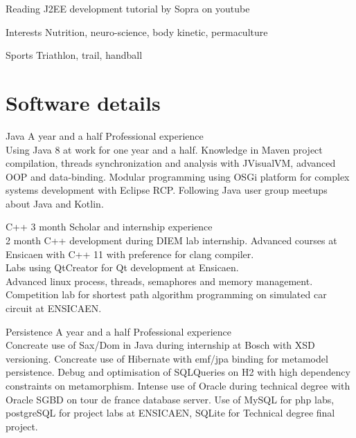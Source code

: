 \documentclass{tccv-master/tccv}
\begin{document}
\begin{factlist}

\item{Reading}
	{J2EE development tutorial by Sopra on youtube}
\item{Interests}
	{Nutrition, neuro-science, body kinetic, permaculture}
\item{Sports}
	{Triathlon, trail, handball}
\end{factlist}
\newpage




\section{Software details}

\begin{eventlist}

\item
{Java}
{A year and a half}
{Professional experience}\\
Using Java 8 at work for one year and a half.
Knowledge in Maven project compilation, threads synchronization and analysis with JVisualVM, advanced OOP and data-binding.
Modular programming using OSGi platform for complex systems development with Eclipse RCP.
Following Java user group meetups about Java and Kotlin.

\item
{C++}
{3 month}
{Scholar and internship experience}\\
2 month C++ development during DIEM lab internship.
Advanced courses at Ensicaen with C++ 11 with preference for clang compiler.\\
Labs using QtCreator for Qt development at Ensicaen.\\
Advanced linux process, threads, semaphores and memory management.
Competition lab for shortest path algorithm programming on simulated car circuit at ENSICAEN.


\item
{Persistence}
{A year and a half}
{Professional experience}\\
Concreate use of Sax/Dom in Java during internship at Bosch with XSD versioning.
Concreate use of Hibernate with emf/jpa binding for metamodel persistence. 
Debug and optimisation of SQLQueries on H2 with high dependency constraints on metamorphism.
Intense use of Oracle during technical degree with Oracle SGBD on tour de france database server.
Use of MySQL for php labs, postgreSQL for project labs at ENSICAEN, SQLite for Technical degree final project.


\end{eventlist}
\end{document}
